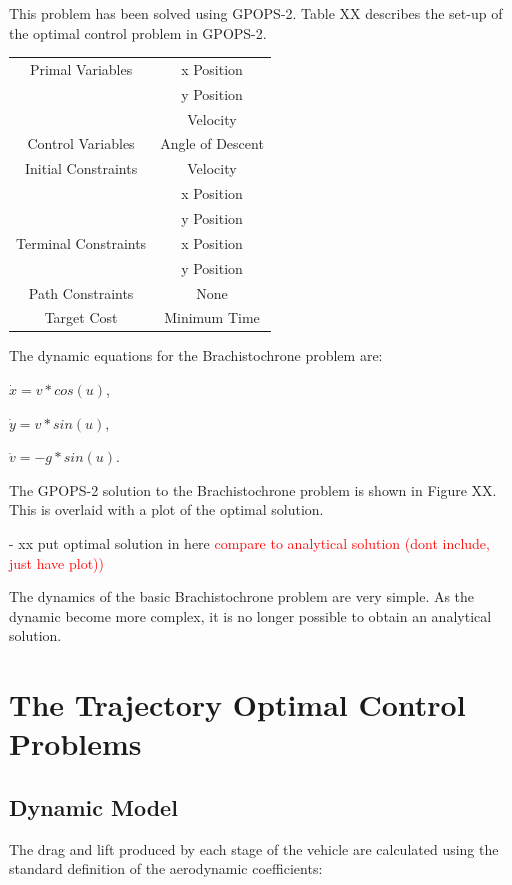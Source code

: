 This problem has been solved using GPOPS-2. Table XX describes the set-up of the optimal control problem in GPOPS-2. 
\begin{table}
\centering
\begin{tabular}{|c|c|}
	\hline Primal Variables  & x Position\\& y Position\\& Velocity\\ 
	\hline Control Variables  & Angle of Descent\\ 
	\hline Initial Constraints  & Velocity\\ & x Position\\ & y Position\\
	\hline Terminal Constraints &  x Position\\ & y Position\\
	\hline Path Constraints & None \\ 
	\hline Target Cost & Minimum Time \\ 
	\hline 
\end{tabular} 
\end{table}
The dynamic equations for the Brachistochrone problem are:

$\dot{x} = v*cos(u)$,

$\dot{y} = v*sin(u)$,

$\dot{v} = -g*sin(u)$.

The GPOPS-2 solution to the Brachistochrone problem is shown in Figure XX. This is overlaid with a plot of the optimal solution.

- xx put optimal solution in here 
\textcolor{red}{compare to analytical solution (dont include, just have plot))}


The dynamics of the basic Brachistochrone problem are very simple. As the dynamic become more complex, it is no longer possible to obtain an analytical solution. 

\section{The Trajectory Optimal Control Problems}

\subsection{Dynamic Model}

The drag and lift produced by each stage of the vehicle are calculated using the standard definition of the aerodynamic coefficients:

